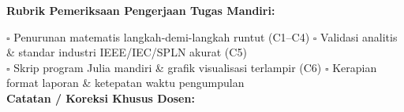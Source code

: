 \documentclass[10pt,a4paper]{article}
\begin{document}
\vspace{2mm}
\begin{tcolorbox}[colback=white,colframe=unibblue!40!black,colbacktitle=unibblue!10,coltitle=unibblue,boxrule=0.5pt,arc=2pt,left=5pt,right=5pt,top=3pt,bottom=3pt,title=\textbf{\tiny Catatan Evaluasi \& Umpan Balik Dosen Pengampu}]
  \tiny
  \textbf{Rubrik Pemeriksaan Pengerjaan Tugas Mandiri:}\par\vspace{0.8mm}
  $\square$ Penurunan matematis langkah-demi-langkah runtut (C1--C4) \hfill $\square$ Validasi analitis \& standar industri IEEE/IEC/SPLN akurat (C5)\\[0.8mm]
  $\square$ Skrip program Julia mandiri \& grafik visualisasi terlampir (C6) \hfill $\square$ Kerapian format laporan \& ketepatan waktu pengumpulan\\[2.0mm]
  \textbf{Catatan / Koreksi Khusus Dosen:}\\[1.6cm]
\end{tcolorbox}
\end{document}
